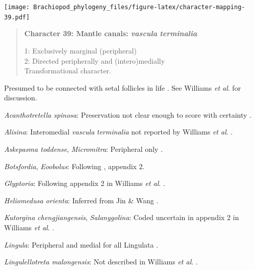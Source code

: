 \documentclass[openany]{book}
\begin{document}
\texttt{[image: Brachiopod\_phylogeny\_files/figure-latex/character-mapping-39.pdf]}

\begin{quote}
\textbf{Character 39: Mantle canals: \emph{vascula} \emph{terminalia}}

1: Exclusively marginal (peripheral)\\
2: Directed peripherally and (intero)medially\\
Transformational character.
\end{quote}

Presumed to be connected with setal follicles in life
\citep{Williams1998Thediversity}. See Williams \emph{et al}.
\citeyearpar{Williams2000LinguliformeaCraniiformea} for discussion.

\hypertarget{Acanthotretella_spinosa-coding-39}{}
\emph{Acanthotretella spinosa}: Preservation not clear enough to score
with certainty \citep{Holmer2006Aspinose}.

\hypertarget{Alisina-coding-39}{}
\emph{Alisina}: Interomedial \emph{vascula} \emph{terminalia} not
reported by Williams \emph{et al}.
\citeyearpar{Williams2000LinguliformeaCraniiformea}.

\hypertarget{Askepasma_toddense-coding-39}{}
\emph{Askepasma toddense}, \emph{Micromitra}: Peripheral only
\citep{Williams1998Thediversity, Williams2000LinguliformeaCraniiformea}.

\hypertarget{Botsfordia-coding-39}{}
\emph{Botsfordia}, \emph{Eoobolus}: Following
\citet{Williams1998Thediversity}, appendix 2.

\hypertarget{Glyptoria-coding-39}{}
\emph{Glyptoria}: Following appendix 2 in Williams \emph{et al}.
\citeyearpar{Williams1998Thediversity}.

\hypertarget{Heliomedusa_orienta-coding-39}{}
\emph{Heliomedusa orienta}: Inferred from Jin \& Wang
\citeyearpar{Jin1992Revisionof}.

\hypertarget{Kutorgina_chengjiangensis-coding-39}{}
\emph{Kutorgina chengjiangensis}, \emph{Salanygolina}: Coded uncertain
in appendix 2 in Williams \emph{et al}.
\citeyearpar{Williams1998Thediversity}.

\hypertarget{Lingula-coding-39}{}
\emph{Lingula}: Peripheral and medial for all Lingulata
\citep{Williams2000LinguliformeaCraniiformea}.

\hypertarget{Lingulellotreta_malongensis-coding-39}{}
\emph{Lingulellotreta malongensis}: Not described in Williams \emph{et
al}. \citeyearpar{Williams2000LinguliformeaCraniiformea}.
\end{document}
